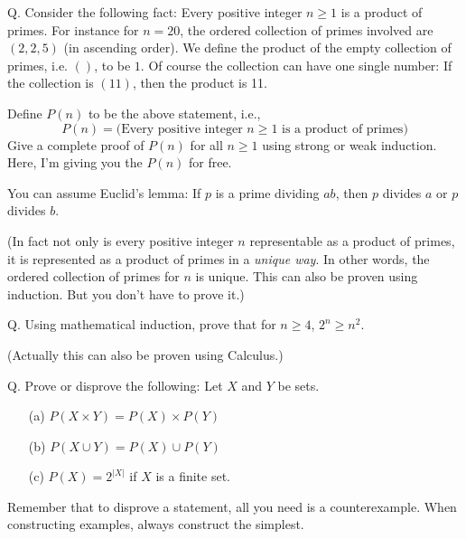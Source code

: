 \SOLUTION



\newpage


\newpage
Q.
Consider the following fact:
Every positive integer $n \geq 1$ is a product of primes.
For instance for $n = 20$,
the ordered collection of primes involved are $(2, 2, 5)$ (in ascending order).
We define the product of the empty collection of primes, i.e. $()$, to be $1$.
Of course the collection can have one single number:
If the collection is $(11)$, then the product is 11.

Define $P(n)$ to be the above statement, i.e.,
\[
  P(n) =
  \biggl(
  \text{Every positive integer $n \geq 1$ is a product of primes}
  \biggr)
\]
Give a complete proof of $P(n)$ for all $n \geq 1$
using strong or weak induction.
Here, I'm giving you the $P(n)$ for free.

You can assume Euclid's lemma: If $p$ is a prime dividing $ab$,
then $p$ divides $a$ or $p$ divides $b$.

(In fact not only is every positive integer $n$ representable
as a product of primes,
it is represented as a product of primes in a \textit{unique way}.
In other words, the ordered collection of primes for $n$ is unique.
This can also be proven using induction.
But you don't have to prove it.)

\SOLUTION



\newpage
Q.
Using mathematical induction, 
prove that for $n \geq 4$, $2^n \geq n^2$.

(Actually this can also be proven using Calculus.)

\SOLUTION



\newpage
Q. Prove or disprove the following: Let $X$ and $Y$ be sets.
\begin{enumerate}
  \item[(a)] $P(X \times Y) = P(X) \times P(Y)$
  \item[(b)] $P(X \cup Y) = P(X) \cup P(Y)$
  \item[(c)] $P(X) = 2^{|X|}$ if $X$ is a finite set.
\end{enumerate}
Remember that to disprove a statement, all you need is a
counterexample.
When constructing examples, always construct the simplest.

